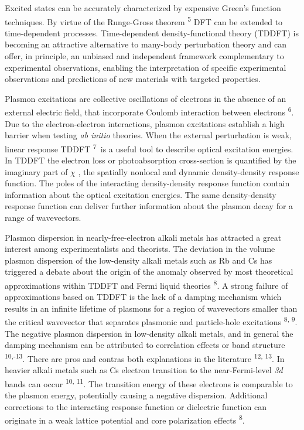 \documentclass[12pt]{article}
\renewcommand{\_}{\kern-1.5pt\textunderscore\kern-1.5pt}
\begin{document}
\begin{justify}
Excited states can be accurately characterized by expensive Green’s function techniques. By virtue of the Runge-Gross theorem \textsuperscript{5} DFT can be extended to time-dependent processes. Time-dependent density-functional theory (TDDFT) is becoming an attractive alternative to many-body perturbation theory and can offer, in principle, an unbiased and independent framework complementary to experimental observations, enabling the interpretation of specific experimental observations and predictions of new materials with targeted properties.
\end{justify}\par

\begin{justify}
Plasmon excitations are collective oscillations of electrons in the absence of an external electric field, that incorporate Coulomb interaction between electrons \textsuperscript{6}. Due to the electron-electron interactions, plasmon excitations establish a high barrier when testing \textit{ab initio} theories. When the external perturbation is weak, linear response TDDFT \textsuperscript{7}\ is a useful tool to describe optical excitation energies. In TDDFT the electron loss or photoabsorption cross-section is quantified by the imaginary part of $ \chi $ , the spatially nonlocal and dynamic density-density response function. The poles of the interacting density-density response function contain information about the optical excitation energies. The same density-density response function can deliver further information about the plasmon decay for a range of wavevectors.  
\end{justify}\par

\begin{justify}
Plasmon dispersion in nearly-free-electron alkali metals has attracted a great interest among experimentalists and theorists. The deviation in the volume plasmon dispersion of the low-density alkali metals such as Rb and Cs has triggered a debate about the origin of the anomaly observed by most theoretical approximations within TDDFT and Fermi liquid theories \textsuperscript{8}. A strong failure of approximations based on TDDFT is the lack of a damping mechanism which results in an infinite lifetime of plasmons for a region of wavevectors smaller than the critical wavevector that separates plasmonic and particle-hole excitations \textsuperscript{8, 9}. The negative plasmon dispersion in low-density alkali metals, and in general the damping mechanism can be attributed to correlation effects or band structure \textsuperscript{10,-13}. There are pros and contras both explanations in the literature \textsuperscript{12, 13}. In heavier alkali metals such as Cs electron transition to the near-Fermi-level \textit{3d} bands can occur \textsuperscript{10, 11}. The transition energy of these electrons is comparable to the plasmon energy, potentially causing a negative dispersion. Additional corrections to the interacting response function or dielectric function can originate in a weak lattice potential and core polarization effects \textsuperscript{8}. 
\end{justify}\par
\end{document}
